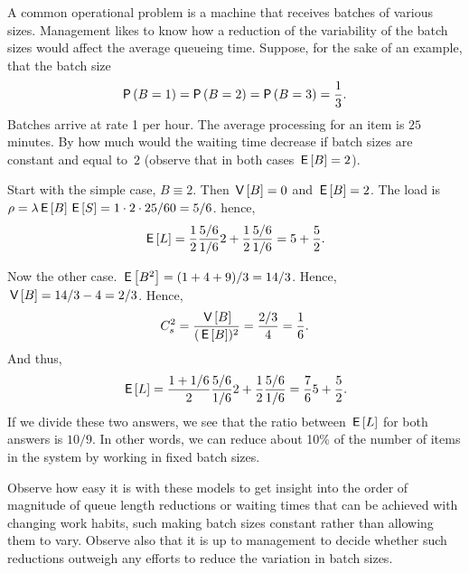 \begin{exercise}
  A common operational problem is a machine that receives batches of
  various sizes. Management likes to know how a reduction of the
  variability of the batch sizes would affect the average queueing time.
  Suppose, for the sake of an example, that the batch size 
  \begin{equation*}
    \P{B=1} = \P{B=2} = \P{B=3} = \frac 13.
  \end{equation*}
  Batches arrive at rate 1 per hour. The average processing for an
  item is $25$ minutes.  By how much would the waiting time decrease if
  batch sizes are constant and equal to~$2$ (observe that in both cases $\,\mathsf{E}\left[B\right] =2$).
  \begin{solution}
    Start with the simple case, $B\equiv 2$. Then $\,\mathsf{V}\left[B\right]=0$ and
    $\,\mathsf{E}\left[B\right] = 2$. The load is $\rho=\lambda \,\mathsf{E}\left[B\right] \,\mathsf{E}\left[S\right] = 1\cdot 2 \cdot 25/60 = 5/6$.  hence,
    \begin{equation*}
      \,\mathsf{E}\left[L\right] = \frac 12 \frac{5/6}{1/6} 2 + \frac 12 \frac{5/6}{1/6} = 5 + \frac52.
    \end{equation*}

Now the other case. $\,\mathsf{E}\left[B^2\right] = (1+4+9)/3 = 14/3$. Hence, $\,\mathsf{V}\left[B\right]=14/3 - 4=2/3$. Hence, 
\begin{equation*}
C_s^2=\frac{\,\mathsf{V}\left[B\right]}{(\,\mathsf{E}\left[B\right])^2} = \frac{2/3}4 = \frac 16.
\end{equation*}
And thus, 
    \begin{equation*}
      \,\mathsf{E}\left[L\right] = \frac {1+1/6}2 \frac{5/6}{1/6} 2 + \frac 12 \frac{5/6}{1/6} = \frac76 5 + \frac 52.
    \end{equation*}
    If we divide these two answers, we see that the ratio between
    $\,\mathsf{E}\left[L\right]$ for both answers is $10/9$. In other words, we can
    reduce about 10\% of the number of items in the system by working
    in fixed batch sizes. 
  \end{solution}
\end{exercise}

Observe how easy it is with these models to get insight into the order
of magnitude of queue length reductions or waiting times that can be
achieved with changing work habits, such making batch sizes constant
rather than allowing them to vary. Observe also that it is up to
management to decide whether such reductions outweigh any efforts to
reduce the variation in batch sizes. 


